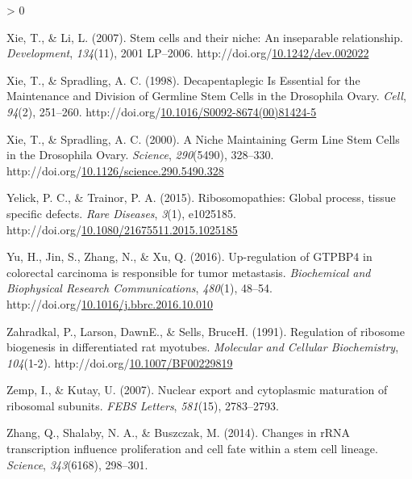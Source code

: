 \documentclass[12pt,oneside]{reedthesis}
\newlength{\cslhangindent}
\newenvironment{CSLReferences}[2] %
 {%
  \setlength{\parindent}{0pt}
  \ifodd #1 \everypar{\setlength{\hangindent}{\cslhangindent}}\ignorespaces\fi
  \ifnum #2 > 0
  \setlength{\parskip}{#2\baselineskip}
  \fi
 }%
 {}
\begin{document}
\begin{CSLReferences}{1}{0}
\leavevmode\hypertarget{ref-Xie2007a}{}%
Xie, T., \& Li, L. (2007). Stem cells and their niche: An inseparable relationship. \emph{Development}, \emph{134}(11), 2001 LP--2006. http://doi.org/\href{https://doi.org/10.1242/dev.002022}{10.1242/dev.002022}

\leavevmode\hypertarget{ref-Xie1998d}{}%
Xie, T., \& Spradling, A. C. (1998). Decapentaplegic {Is Essential} for the {Maintenance} and {Division} of {Germline Stem Cells} in the {Drosophila Ovary}. \emph{Cell}, \emph{94}(2), 251--260. http://doi.org/\href{https://doi.org/10.1016/S0092-8674(00)81424-5}{10.1016/S0092-8674(00)81424-5}

\leavevmode\hypertarget{ref-Xie2000b}{}%
Xie, T., \& Spradling, A. C. (2000). A {Niche Maintaining Germ Line Stem Cells} in the {Drosophila Ovary}. \emph{Science}, \emph{290}(5490), 328--330. http://doi.org/\href{https://doi.org/10.1126/science.290.5490.328}{10.1126/science.290.5490.328}

\leavevmode\hypertarget{ref-Yelick2015a}{}%
Yelick, P. C., \& Trainor, P. A. (2015). Ribosomopathies: {Global} process, tissue specific defects. \emph{Rare Diseases}, \emph{3}(1), e1025185. http://doi.org/\href{https://doi.org/10.1080/21675511.2015.1025185}{10.1080/21675511.2015.1025185}

\leavevmode\hypertarget{ref-yuUpregulationGTPBP4Colorectal2016}{}%
Yu, H., Jin, S., Zhang, N., \& Xu, Q. (2016). Up-regulation of {GTPBP4} in colorectal carcinoma is responsible for tumor metastasis. \emph{Biochemical and Biophysical Research Communications}, \emph{480}(1), 48--54. http://doi.org/\href{https://doi.org/10.1016/j.bbrc.2016.10.010}{10.1016/j.bbrc.2016.10.010}

\leavevmode\hypertarget{ref-zahradkalRegulationRibosomeBiogenesis1991}{}%
Zahradkal, P., Larson, DawnE., \& Sells, BruceH. (1991). Regulation of ribosome biogenesis in differentiated rat myotubes. \emph{Molecular and Cellular Biochemistry}, \emph{104}(1-2). http://doi.org/\href{https://doi.org/10.1007/BF00229819}{10.1007/BF00229819}

\leavevmode\hypertarget{ref-Zemp2007}{}%
Zemp, I., \& Kutay, U. (2007). Nuclear export and cytoplasmic maturation of ribosomal subunits. \emph{FEBS Letters}, \emph{581}(15), 2783--2793.

\leavevmode\hypertarget{ref-Zhang2014d}{}%
Zhang, Q., Shalaby, N. A., \& Buszczak, M. (2014). Changes in {rRNA} transcription influence proliferation and cell fate within a stem cell lineage. \emph{Science}, \emph{343}(6168), 298--301.


\end{CSLReferences}
\end{document}
